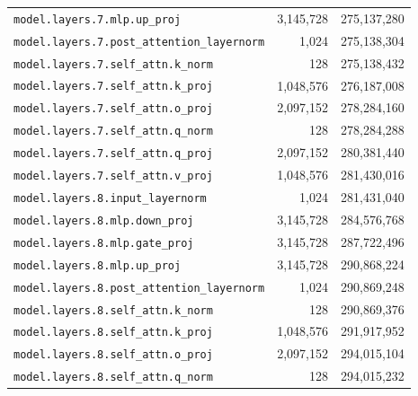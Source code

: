 \documentclass[10pt,a4paper]{article}
\theoremstyle{definition}
\begin{document}
\begin{appendices}
\begin{longtable}{p{9.5cm}rr}
\texttt{model.\allowbreak{}layers.\allowbreak{}7.\allowbreak{}mlp.\allowbreak{}up\_proj} & 3,145,728 & 275,137,280 \\
\texttt{model.\allowbreak{}layers.\allowbreak{}7.\allowbreak{}post\_attention\_layernorm} & 1,024 & 275,138,304 \\
\texttt{model.\allowbreak{}layers.\allowbreak{}7.\allowbreak{}self\_attn.\allowbreak{}k\_norm} & 128 & 275,138,432 \\
\texttt{model.\allowbreak{}layers.\allowbreak{}7.\allowbreak{}self\_attn.\allowbreak{}k\_proj} & 1,048,576 & 276,187,008 \\
\texttt{model.\allowbreak{}layers.\allowbreak{}7.\allowbreak{}self\_attn.\allowbreak{}o\_proj} & 2,097,152 & 278,284,160 \\
\texttt{model.\allowbreak{}layers.\allowbreak{}7.\allowbreak{}self\_attn.\allowbreak{}q\_norm} & 128 & 278,284,288 \\
\texttt{model.\allowbreak{}layers.\allowbreak{}7.\allowbreak{}self\_attn.\allowbreak{}q\_proj} & 2,097,152 & 280,381,440 \\
\texttt{model.\allowbreak{}layers.\allowbreak{}7.\allowbreak{}self\_attn.\allowbreak{}v\_proj} & 1,048,576 & 281,430,016 \\
\texttt{model.\allowbreak{}layers.\allowbreak{}8.\allowbreak{}input\_layernorm} & 1,024 & 281,431,040 \\
\texttt{model.\allowbreak{}layers.\allowbreak{}8.\allowbreak{}mlp.\allowbreak{}down\_proj} & 3,145,728 & 284,576,768 \\
\texttt{model.\allowbreak{}layers.\allowbreak{}8.\allowbreak{}mlp.\allowbreak{}gate\_proj} & 3,145,728 & 287,722,496 \\
\texttt{model.\allowbreak{}layers.\allowbreak{}8.\allowbreak{}mlp.\allowbreak{}up\_proj} & 3,145,728 & 290,868,224 \\
\texttt{model.\allowbreak{}layers.\allowbreak{}8.\allowbreak{}post\_attention\_layernorm} & 1,024 & 290,869,248 \\
\texttt{model.\allowbreak{}layers.\allowbreak{}8.\allowbreak{}self\_attn.\allowbreak{}k\_norm} & 128 & 290,869,376 \\
\texttt{model.\allowbreak{}layers.\allowbreak{}8.\allowbreak{}self\_attn.\allowbreak{}k\_proj} & 1,048,576 & 291,917,952 \\
\texttt{model.\allowbreak{}layers.\allowbreak{}8.\allowbreak{}self\_attn.\allowbreak{}o\_proj} & 2,097,152 & 294,015,104 \\
\texttt{model.\allowbreak{}layers.\allowbreak{}8.\allowbreak{}self\_attn.\allowbreak{}q\_norm} & 128 & 294,015,232 \\

\end{longtable}
\end{appendices}
\end{document}
